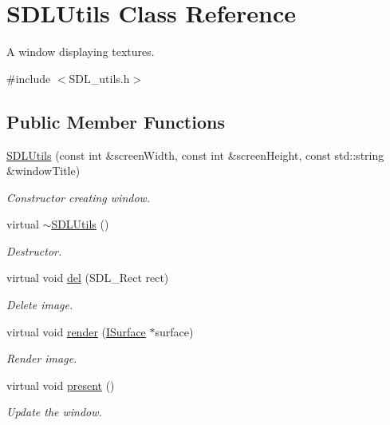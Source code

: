 \hypertarget{class_s_d_l_utils}{}\section{S\+D\+L\+Utils Class Reference}
\label{class_s_d_l_utils}


A window displaying textures.  




{\ttfamily \#include $<$S\+D\+L\+\_\+utils.\+h$>$}

\subsection*{Public Member Functions}
\begin{DoxyCompactItemize}
\item 
\mbox{\hyperlink{class_s_d_l_utils_a53e5b8a0018c3d96af3ad413b2272f3d}{S\+D\+L\+Utils}} (const int \&screen\+Width, const int \&screen\+Height, const std\+::string \&window\+Title)
\begin{DoxyCompactList}\small\item\em Constructor creating window. \end{DoxyCompactList}\item 
virtual \mbox{\hyperlink{class_s_d_l_utils_a4530f05f7fdf2495a63ff1e9fc553680}{$\sim$\+S\+D\+L\+Utils}} ()
\begin{DoxyCompactList}\small\item\em Destructor. \end{DoxyCompactList}\item 
virtual void \mbox{\hyperlink{class_s_d_l_utils_a8dfdc8f41938c2c53ac5121c10eb1638}{del}} (S\+D\+L\+\_\+\+Rect rect)
\begin{DoxyCompactList}\small\item\em Delete image. \end{DoxyCompactList}\item 
virtual void \mbox{\hyperlink{class_s_d_l_utils_a8a30592df5e936b71f27283538e4cece}{render}} (\mbox{\hyperlink{class_i_surface}{I\+Surface}} $\ast$surface)
\begin{DoxyCompactList}\small\item\em Render image. \end{DoxyCompactList}\item 
virtual void \mbox{\hyperlink{class_s_d_l_utils_a0e9c4b007ae61772a1c41592877b30ab}{present}} ()
\begin{DoxyCompactList}\small\item\em Update the window. \end{DoxyCompactList}\end{DoxyCompactItemize}


